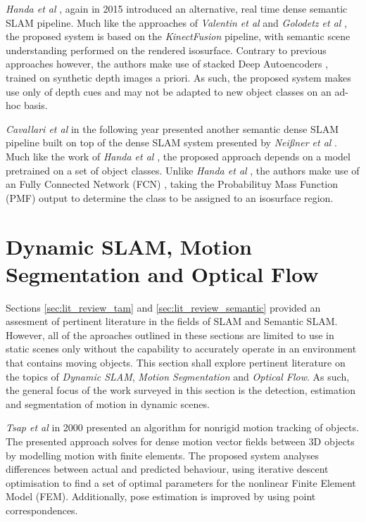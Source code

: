 {\textit{Handa et al} \cite{Handa2015}, again in 2015 introduced an alternative, 
real time dense semantic SLAM pipeline. Much like the approaches of \textit{Valentin et al} 
\cite{Valentin2015} and \textit{Golodetz et al} \cite{Golodetz2015}, the proposed system 
is based on the \textit{KinectFusion} \cite{Newcombe2011} pipeline, with semantic scene 
understanding performed on the rendered isosurface. Contrary to previous approaches however, 
the authors make use of stacked Deep Autoencoders \cite{Liou2008}, trained on synthetic depth 
images a priori. As such, the proposed system makes use only of depth cues and may not be 
adapted to new object classes on an ad-hoc basis.

\textit{Cavallari et al} \cite{Cavallari2016} in the following year presented another 
semantic dense SLAM pipeline built on top of the dense SLAM system presented by 
\textit{Nei{\ss}ner et al} \cite{NieBner2013}. Much like the work of \textit{Handa et al} 
\cite{Handa2015}, the proposed approach depends on a model pretrained on a set of object 
classes. Unlike \textit{Handa et al} \cite{Handa2015}, the authors make use of an 
Fully Connected Network (FCN) \cite{Long2015}, taking the Probabilituy Mass Function (PMF) 
output to determine the class to be assigned to an isosurface region.

\section{Dynamic SLAM, Motion Segmentation and Optical Flow}
\label{sec:lit_review_dynamic}
Sections \ref{sec:lit_review_tam} and \ref{sec:lit_review_semantic} provided an assesment 
of pertinent literature in the fields of SLAM and Semantic SLAM. However, all of the 
aproaches outlined in these sections are limited to use in static scenes only without 
the capability to accurately operate in an environment that contains moving objects. This 
section shall explore pertinent literature on the topics of \textit{Dynamic SLAM}, 
\textit{Motion Segmentation} and \textit{Optical Flow}. As such, the general focus of the 
work surveyed in this section is the detection, estimation and segmentation of motion in 
dynamic scenes.

\textit{Tsap et al} \cite{Tsap2000} in 2000 presented an algorithm for nonrigid motion 
tracking of objects. The presented approach solves for dense motion vector fields between 
3D objects by modelling motion with finite elements. The proposed system analyses differences 
between actual and predicted behaviour, using iterative descent optimisation \cite{IDO} to find 
a set of optimal parameters for the nonlinear Finite Element Model (FEM). Additionally, pose 
estimation is improved by using point correspondences.

}

